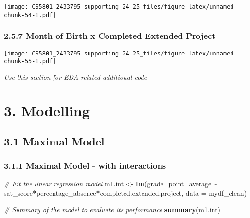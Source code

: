 \documentclass[
]{article}
\newenvironment{Shaded}{\begin{snugshade}}{\end{snugshade}}
\newcommand{\AttributeTok}[1]{\textcolor[rgb]{0.13,0.29,0.53}{#1}}
\newcommand{\CommentTok}[1]{\textcolor[rgb]{0.56,0.35,0.01}{\textit{#1}}}
\newcommand{\FunctionTok}[1]{\textcolor[rgb]{0.13,0.29,0.53}{\textbf{#1}}}
\newcommand{\NormalTok}[1]{#1}
\newcommand{\OtherTok}[1]{\textcolor[rgb]{0.56,0.35,0.01}{#1}}
\newcommand{\SpecialCharTok}[1]{\textcolor[rgb]{0.81,0.36,0.00}{\textbf{#1}}}
\newcommand{\StringTok}[1]{\textcolor[rgb]{0.31,0.60,0.02}{#1}}
\begin{document}
\texttt{[image: CS5801\_2433795-supporting-24-25\_files/figure-latex/unnamed-chunk-54-1.pdf]}

\subsubsection{2.5.7 Month of Birth x Completed Extended
Project}\label{month-of-birth-x-completed-extended-project}

\begin{Shaded}
\end{Shaded}

\texttt{[image: CS5801\_2433795-supporting-24-25\_files/figure-latex/unnamed-chunk-55-1.pdf]}

\emph{Use this section for EDA related additional code}

\section{3. Modelling}\label{modelling}

\subsection{3.1 Maximal Model}\label{maximal-model}

\subsubsection{3.1.1 Maximal Model - with
interactions}\label{maximal-model---with-interactions}

\begin{Shaded}
\begin{Highlighting}[]
\CommentTok{\# Fit the linear regression model}
\NormalTok{m1.int }\OtherTok{\textless{}{-}} \FunctionTok{lm}\NormalTok{(grade\_point\_average }\SpecialCharTok{\textasciitilde{}}\NormalTok{ sat\_score}\SpecialCharTok{*}\NormalTok{percentage\_absence}\SpecialCharTok{*}\NormalTok{completed.extended.project, }\AttributeTok{data =}\NormalTok{ mydf\_clean)}

\CommentTok{\# Summary of the model to evaluate its performance}
\FunctionTok{summary}\NormalTok{(m1.int)}
\end{Highlighting}
\end{Shaded}
\end{document}
